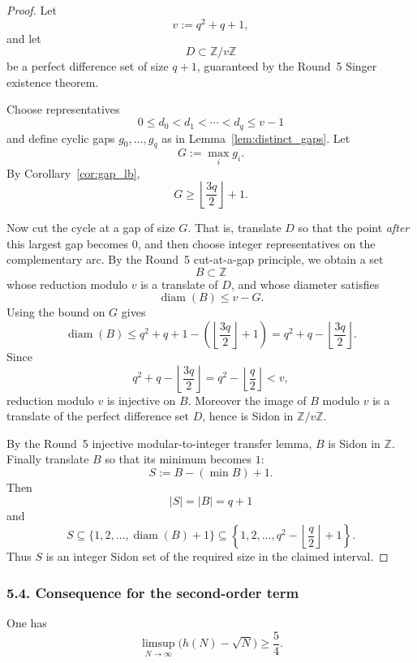 \begin{proof}
Let
\[
v:=q^2+q+1,
\]
and let
\[
D\subset \mathbb Z/v\mathbb Z
\]
be a perfect difference set of size $q+1$, guaranteed by the Round~5 Singer existence theorem.

Choose representatives
\[
0\le d_0<d_1<\cdots<d_q\le v-1
\]
and define cyclic gaps $g_0,\dots,g_q$ as in Lemma~\ref{lem:distinct_gaps}.
Let
\[
G:=\max_i g_i.
\]
By Corollary~\ref{cor:gap_lb},
\[
G\ge \left\lfloor \frac{3q}{2}\right\rfloor+1.
\]

Now cut the cycle at a gap of size $G$.
That is, translate $D$ so that the point \emph{after} this largest gap becomes $0$, and then choose integer representatives on the complementary arc.
By the Round~5 cut-at-a-gap principle, we obtain a set
\[
B\subset \mathbb Z
\]
whose reduction modulo $v$ is a translate of $D$, and whose diameter satisfies
\[
\operatorname{diam}(B)\le v-G.
\]
Using the bound on $G$ gives
\[
\operatorname{diam}(B)\le q^2+q+1-\left(\left\lfloor \frac{3q}{2}\right\rfloor+1\right)
= q^2+q-\left\lfloor \frac{3q}{2}\right\rfloor.
\]
Since
\[
q^2+q-\left\lfloor \frac{3q}{2}\right\rfloor
=
q^2-\left\lfloor \frac q2\right\rfloor
< v,
\]
reduction modulo $v$ is injective on $B$.
Moreover the image of $B$ modulo $v$ is a translate of the perfect difference set $D$, hence is Sidon in $\mathbb Z/v\mathbb Z$.

By the Round~5 injective modular-to-integer transfer lemma, $B$ is Sidon in $\mathbb Z$.
Finally translate $B$ so that its minimum becomes $1$:
\[
S:=B-(\min B)+1.
\]
Then
\[
|S|=|B|=q+1
\]
and
\[
S\subseteq \{1,2,\dots,\operatorname{diam}(B)+1\}
   \subseteq \left\{1,2,\dots, q^2-\left\lfloor \frac q2\right\rfloor+1\right\}.
\]
Thus $S$ is an integer Sidon set of the required size in the claimed interval.
\end{proof}

\subsubsection{5.4. Consequence for the second-order term}
\begin{corollary}\label{cor:limsup_5_4}
One has
\[
\limsup_{N\to\infty}\bigl(h(N)-\sqrt N\bigr)\ge \frac54.
\]
\end{corollary}

